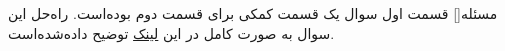 
‌مسئله[]
قسمت اول سوال یک قسمت کمکی برای قسمت دوم بوده‌است. راه‌حل این سوال به صورت کامل در این
\href{https://www.geeksforgeeks.org/largest-rectangle-under-histogram/}{لینک}
توضیح داده‌شده‌است.















